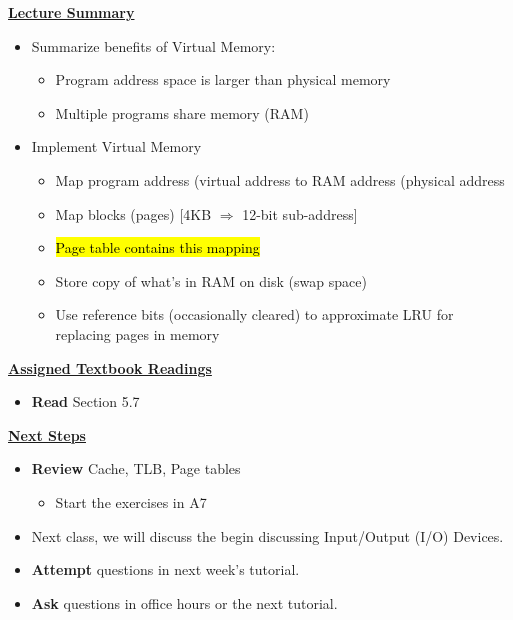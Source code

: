 

\begin{frame}[fragile]
 \underline{\textbf{Lecture Summary}}
 \begin{itemize}
\item Summarize benefits of Virtual Memory:
\begin{itemize}
  \item Program address space is larger than physical memory
  \item Multiple programs share memory (RAM)
\end{itemize}
\item Implement Virtual Memory
  \begin{itemize}
  \item Map program address (virtual address to RAM address (physical address
  \item Map blocks (pages) [4KB $\Rightarrow$ 12-bit sub-address]
  \item \hl{Page table contains this mapping}
  \item Store copy of what's in RAM on disk (swap space)
  \item Use reference bits (occasionally cleared) to approximate LRU for replacing pages in memory
  \end{itemize}
\end{itemize}

 \underline{\textbf{Assigned Textbook Readings}}
\begin{itemize}
   \item \textbf{Read} Section 5.7
     \end{itemize}
    \underline{\textbf{Next Steps}}
    \begin{itemize}
     \item \textbf{Review} Cache, TLB, Page tables
\begin{itemize}
    \item Start the exercises in A7
\end{itemize}
\item Next class, we will discuss the begin discussing Input/Output (I/O) Devices. 
\item \textbf{Attempt} questions in next week's tutorial. 
    \item \textbf{Ask} questions in office hours or the next tutorial.
 \end{itemize}

\end{frame}

